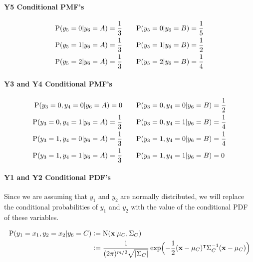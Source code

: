 \documentclass[12pt]{article}
\begin{document}
\begin{enumerate}[leftmargin=\labelsep]
\begin{enumerate}
        \paragraph{Y5 Conditional PMF's}

        \begin{equation}
        \begin{split}
            \textrm{P}(y_5 = 0 | y_6 = A) = \frac{1}{3} &\qquad \textrm{P}(y_5 = 0 | y_6 = B) = \frac{1}{5} \\
            \textrm{P}(y_5 = 1 | y_6 = A) = \frac{1}{3} &\qquad \textrm{P}(y_5 = 1 | y_6 = B) = \frac{1}{2} \\
            \textrm{P}(y_5 = 2 | y_6 = A) = \frac{1}{3} &\qquad \textrm{P}(y_5 = 2 | y_6 = B) = \frac{1}{4}
        \end{split}
        \end{equation}

        \paragraph{Y3 and Y4 Conditional PMF's}

        \begin{equation}
        \begin{split}
            \textrm{P}(y_3 = 0, y_4 = 0 | y_6 = A) = 0 &\qquad \textrm{P}(y_3 = 0, y_4 = 0 | y_6 = B) = \frac{1}{2} \\
            \textrm{P}(y_3 = 0, y_4 = 1 | y_6 = A) = \frac{1}{3} &\qquad \textrm{P}(y_3 = 0, y_4 = 1 | y_6 = B) = \frac{1}{4} \\
            \textrm{P}(y_3 = 1, y_4 = 0 | y_6 = A) = \frac{1}{3} &\qquad \textrm{P}(y_3 = 1, y_4 = 0 | y_6 = B) = \frac{1}{4} \\
            \textrm{P}(y_3 = 1, y_4 = 1 | y_6 = A) = \frac{1}{3} &\qquad \textrm{P}(y_3 = 1, y_4 = 1 | y_6 = B) = 0
        \end{split}
        \end{equation}

        \paragraph{Y1 and Y2 Conditional PDF's}
        Since we are assuming that $y_1$ and $y_2$ are normally distributed, we will replace the conditional probabilities of $y_1$ and $y_2$ with the value of the conditional PDF of these variables.

        \begin{equation}
        \begin{split}
            \textrm{P}(y_1 = x_1, y_2 = x_2 | y_6 = C) &\vcentcolon= \textrm{N}(\mathbf{x} | \mu_C, \Sigma_C) \\
            &\vcentcolon= \frac{1}{(2\pi)^{m/2}\sqrt{|\Sigma_C|}}\exp\Bigl(-\frac{1}{2}(\mathbf{x}-\mu_C)^\intercal \Sigma_C^{-1} (\mathbf{x}-\mu_C)\Bigr)
        \end{split}
        \end{equation}


\end{enumerate}
\end{enumerate}
\end{document}

